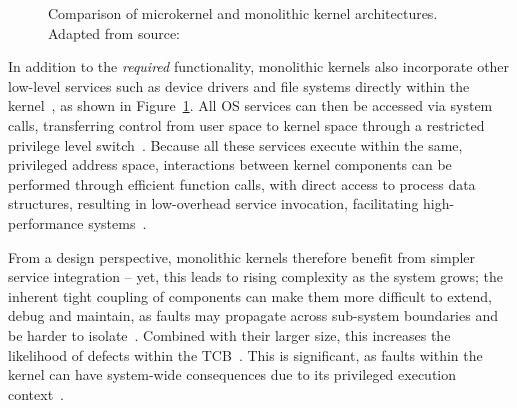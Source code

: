 \begin{figure}[h]
\caption{Comparison of microkernel and monolithic kernel architectures. Adapted from source: \cite{micro_mono_diag_adapt}}
\label{fig:micro-vs-mono}
\end{figure}
\vspace{0.15cm}
In addition to the \textit{required} functionality, monolithic kernels also incorporate other low-level services such as device drivers and file systems directly within the kernel~\cite{dautenhahn_nested_2015}, as shown in Figure~\ref{fig:micro-vs-mono}. All OS services can then be accessed via system calls, transferring control from user space to kernel space through a restricted privilege level switch~\cite{novikov2018verification}. Because all these services execute within the same, privileged address space, interactions between kernel components can be performed through efficient function calls, with direct access to process data structures, resulting in low-overhead service invocation, facilitating high-performance systems~\cite{tanenbaum_modern_2015}.

From a design perspective, monolithic kernels therefore benefit from simpler service integration -- yet, this leads to rising complexity as the system grows; the inherent tight coupling of components can make them more difficult to extend, debug and maintain, as faults may propagate across sub-system boundaries and be harder to isolate~\cite{stallings_operating_2011}. Combined with their larger size, this increases the likelihood of defects within the TCB~\cite{tanenbaum_modern_2015}. This is significant, as faults within the kernel can have system-wide consequences due to its privileged execution context~\cite{hofmann_ensuring_2011}. 

